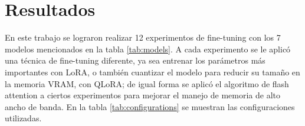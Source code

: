 \documentclass[twocolumn]{article}
\begin{document}



\section{Resultados}

{En este trabajo se lograron realizar 12 experimentos de fine-tuning con los 7 modelos mencionados en la tabla \ref{tab:models}. A cada experimento se le aplicó una técnica de fine-tuning diferente, ya sea entrenar los parámetros más importantes con LoRA, o también cuantizar el modelo para reducir su tamaño en la memoria VRAM, con QLoRA; de igual forma se aplicó el algoritmo de flash attention \cite{dao2022flashattentionfastmemoryefficientexact} a ciertos experimentos para mejorar el manejo de memoria de alto ancho de banda. En la tabla \ref{tab:configurations} se muestran las configuraciones utilizadas.}
\end{document}
